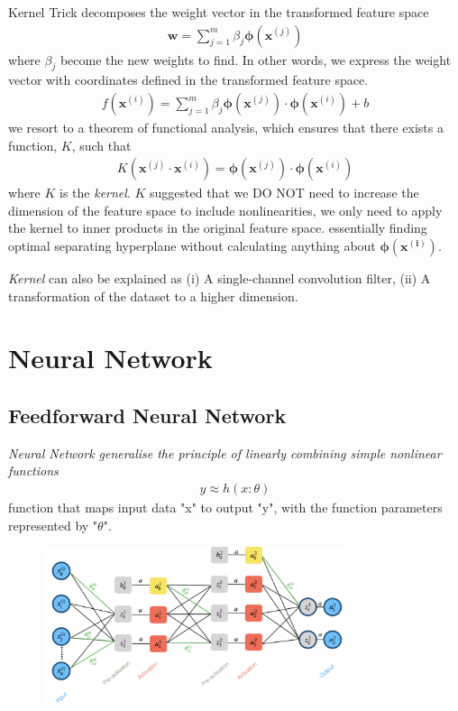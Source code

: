 \documentclass[a4paper,10pt]{article}
\begin{document}
Kernel Trick decomposes the weight vector in the transformed feature space
\begin{gather*}
    \mathbf{w} = \sum_{j=1}^{m}\beta_j\pmb{\phi}(\pmb{x}^{(j)})
\end{gather*}
where $\beta_j$ become the new weights to find. In other words, we express the weight vector with coordinates defined in the transformed feature space.
\begin{gather*}
    f(\pmb{x}^{(i)}) = \sum_{j=1}^{m}\beta_j\pmb{\phi}(\pmb{x}^{(j)})\cdot\pmb{\phi}(\pmb{x}^{(i)})+b 
\end{gather*}
we resort to a theorem of functional analysis, which ensures that there exists a function, $K$, such that
\begin{gather*}
    K(\pmb{x}^{(j)}\cdot\pmb{x}^{(i)}) = \pmb{\phi}(\pmb{x}^{(j)})\cdot\pmb{\phi}(\pmb{x}^(i))
\end{gather*}
where $K$ is the \textit{kernel}. $K$ suggested that we DO NOT need to increase the dimension of the feature space to include nonlinearities, we only need to apply the kernel to inner products in the original feature space. essentially finding optimal separating hyperplane without calculating anything about $\pmb{\phi(x^{(i)})}$.\par 

\textit{Kernel} can also be explained as (i) A single-channel convolution filter, (ii) A transformation of the dataset to a higher dimension.




\section{Neural Network}
\subsection{Feedforward Neural Network}
\textit{Neural Network generalise the principle of linearly combining simple nonlinear functions}
\begin{gather*}
    y\approx h(x:\theta)
\end{gather*}
function that maps input data "x" to output "y", with the function parameters represented by "$\theta$".

\begin{figure}[ht]
    \centering
    \includegraphics[width =0.8\textwidth]{FNN.png}
\end{figure}
\end{document}
